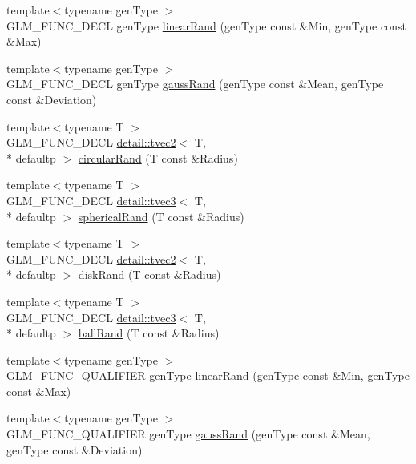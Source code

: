 \begin{DoxyCompactItemize}
{\footnotesize template$<$typename gen\-Type $>$ }\\G\-L\-M\-\_\-\-F\-U\-N\-C\-\_\-\-D\-E\-C\-L gen\-Type \hyperlink{group__gtc__random_ga310c2e65883e62a4405128f187f41f27}{linear\-Rand} (gen\-Type const \&Min, gen\-Type const \&Max)
\item 
{\footnotesize template$<$typename gen\-Type $>$ }\\G\-L\-M\-\_\-\-F\-U\-N\-C\-\_\-\-D\-E\-C\-L gen\-Type \hyperlink{group__gtc__random_gacba09f5b8e1e8eac3d318ae6426bbd26}{gauss\-Rand} (gen\-Type const \&Mean, gen\-Type const \&Deviation)
\item 
{\footnotesize template$<$typename T $>$ }\\G\-L\-M\-\_\-\-F\-U\-N\-C\-\_\-\-D\-E\-C\-L \hyperlink{structglm_1_1detail_1_1tvec2}{detail\-::tvec2}$<$ T, \\*
defaultp $>$ \hyperlink{group__gtc__random_gac1ab03c2c797ce352fd74cdb5229b151}{circular\-Rand} (T const \&Radius)
\item 
{\footnotesize template$<$typename T $>$ }\\G\-L\-M\-\_\-\-F\-U\-N\-C\-\_\-\-D\-E\-C\-L \hyperlink{structglm_1_1detail_1_1tvec3}{detail\-::tvec3}$<$ T, \\*
defaultp $>$ \hyperlink{group__gtc__random_ga8a9eee1fcb08690881ead242fe4259dc}{spherical\-Rand} (T const \&Radius)
\item 
{\footnotesize template$<$typename T $>$ }\\G\-L\-M\-\_\-\-F\-U\-N\-C\-\_\-\-D\-E\-C\-L \hyperlink{structglm_1_1detail_1_1tvec2}{detail\-::tvec2}$<$ T, \\*
defaultp $>$ \hyperlink{group__gtc__random_ga7d24fc3ef13fd7b6cad7e7b870b0e322}{disk\-Rand} (T const \&Radius)
\item 
{\footnotesize template$<$typename T $>$ }\\G\-L\-M\-\_\-\-F\-U\-N\-C\-\_\-\-D\-E\-C\-L \hyperlink{structglm_1_1detail_1_1tvec3}{detail\-::tvec3}$<$ T, \\*
defaultp $>$ \hyperlink{group__gtc__random_gac9c6e44b013874c291547f568d240500}{ball\-Rand} (T const \&Radius)
\item 
{\footnotesize template$<$typename gen\-Type $>$ }\\G\-L\-M\-\_\-\-F\-U\-N\-C\-\_\-\-Q\-U\-A\-L\-I\-F\-I\-E\-R gen\-Type \hyperlink{group__gtc__random_ga310c2e65883e62a4405128f187f41f27}{linear\-Rand} (gen\-Type const \&Min, gen\-Type const \&Max)
\item 
{\footnotesize template$<$typename gen\-Type $>$ }\\G\-L\-M\-\_\-\-F\-U\-N\-C\-\_\-\-Q\-U\-A\-L\-I\-F\-I\-E\-R gen\-Type \hyperlink{group__gtc__random_gacba09f5b8e1e8eac3d318ae6426bbd26}{gauss\-Rand} (gen\-Type const \&Mean, gen\-Type const \&Deviation)

\end{DoxyCompactItemize}
